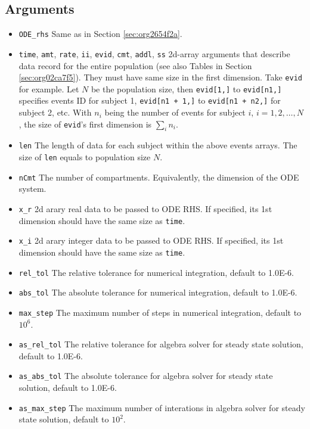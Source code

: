 \documentclass[12pt, reqno, oneside]{amsbook}
\numberwithin{equation}{chapter}
\numberwithin{figure}{chapter}
\numberwithin{table}{chapter}
\theoremstyle{remark}
\begin{document}
\subsection{Arguments}
\label{sec:org8761582}
\begin{itemize}
\item \texttt{ODE\_rhs}
Same as in Section \ref{sec:org2654f2a}.
\item \texttt{time}, \texttt{amt}, \texttt{rate}, \texttt{ii}, \texttt{evid}, \texttt{cmt}, \texttt{addl}, \texttt{ss}
2d-array arguments that describe data record for the
entire population (see also Tables in Section \ref{sec:org02ca7f5}). They must have same size in the first
dimension. Take \texttt{evid} for example. Let \(N\) be the
population size, then \texttt{evid[1,]} to
\texttt{evid[n1,]} specifies events ID for subject 1,
\texttt{evid[n1 + 1,]} to
\texttt{evid[n1 + n2,]} for subject 2, etc. With \(n_i\)
being the number of events for subject \(i\), \(i=1, 2, \dots, N\), the
size of \texttt{evid}'s first dimension is \(\sum_{i}n_i\).
\item \texttt{len}
The length of data for each subject within
the above events arrays. The size of \texttt{len} equals
to population size \(N\).
\item \texttt{nCmt}
The number of compartments. Equivalently, the dimension of the ODE system.
\item \texttt{x\_r}
2d arary real data to be passed to ODE RHS. If specified, its 1st
dimension should have the same size as \texttt{time}.
\item \texttt{x\_i}
2d arary integer data to be passed to ODE RHS. If specified, its 1st
dimension should have the same size as \texttt{time}.
\item \texttt{rel\_tol}
The relative tolerance for numerical integration, default to 1.0E-6.
\item \texttt{abs\_tol}
The absolute tolerance for numerical integration, default to 1.0E-6.
\item \texttt{max\_step}
The maximum number of steps in numerical integration, default to \(10^6\).
\item \texttt{as\_rel\_tol}
The relative tolerance for algebra solver for steady state solution, default to 1.0E-6.
\item \texttt{as\_abs\_tol}
The absolute tolerance for algebra solver for steady state solution, default to 1.0E-6.
\item \texttt{as\_max\_step}
The maximum number of interations in algebra solver for steady state solution, default to \(10^2\).
\end{itemize}
\end{document}
